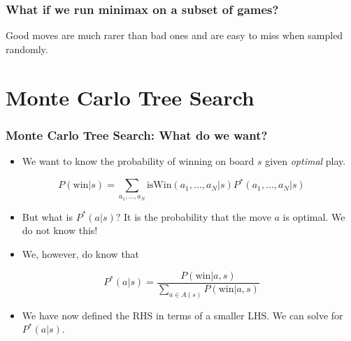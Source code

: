 \documentclass{beamer}
\begin{document}
\begin{frame}
  \frametitle{What if we run minimax on a subset of games?}
  \begin{center}
      Good moves are much rarer than bad ones and are easy to miss when sampled randomly.
  \end{center}
\end{frame}

\section{Monte Carlo Tree Search}

\begin{frame}
  \frametitle{Monte Carlo Tree Search: What do we want?}
  \begin{itemize}
  \item We want to know the probability of winning on board $s$ given \emph{optimal} play.
  \end{itemize}
  \pause
  \begin{displaymath}
    P(\text{win} | s) = \sum_{a_1, \dots, a_N} \text{isWin}(a_1,\dots, a_N | s)P^*(a_1, \dots, a_N | s)
  \end{displaymath}
  \pause
  \begin{itemize}
  \item But what is $P^*(a | s) $? It is the probability that the move $a$ is optimal. We do not know this!
  \pause
  \item We, however, do know that
  \end{itemize}
  \begin{displaymath}
    P^*(a | s) = \frac{P(\text{win} | a, s)}{\sum_{a\in A(s)} P(\text{win} | a, s)}
  \end{displaymath}
  \pause
  \begin{itemize}    
  \item We have now defined the RHS in terms of a smaller LHS. We can solve for $P^*(a | s)$.
  \end{itemize}
\end{frame}
\end{document}
